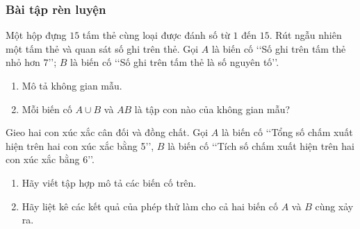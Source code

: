 \subsubsection{Bài tập rèn luyện}
\begin{bt}%
	Một hộp đựng $15$ tấm thẻ cùng loại được đánh số từ $1$ đến $15$. Rút ngẫu nhiên một tấm thẻ và quan sát số ghi trên thẻ. Gọi $A$ là biến cố \lq\lq Số ghi trên tấm thẻ nhỏ hơn $7$\rq\rq; $B$ là biến cố \lq\lq Số ghi trên tấm thẻ là số nguyên tố\rq\rq.
	\begin{enumerate}
		\item Mô tả không gian mẫu.
		\item Mỗi biến cố $A \cup B$ và $A B$ là tập con nào của không gian mẫu?
	\end{enumerate}
\end{bt}
\begin{bt}%
	Gieo hai con xúc xắc cân đối và đồng chất. Gọi $A$ là biến cố \lq\lq Tổng số chấm xuất hiện trên hai con xúc xắc bằng 5\rq\rq, $B$ là biến cố \lq\lq Tích số chấm xuất hiện trên hai con xúc xắc bằng 6\rq\rq.
	\begin{enumerate}
		\item Hãy viết tập hợp mô tả các biến cố trên.
		\item Hãy liệt kê các kết quả của phép thử làm cho cả hai biến cố $A$ và $B$ cùng xảy ra.
	\end{enumerate}
\end{bt}
